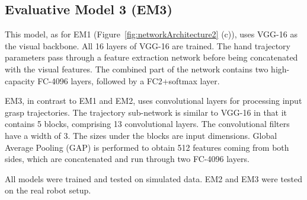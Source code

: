 \subsection{Evaluative Model 3 (EM3)}
\noindent
This model, as for EM1 (Figure~\ref{fig:networkArchitecture2} (c)), uses VGG-16 as the visual backbone. All 16 layers of VGG-16 are trained. The hand trajectory parameters pass through a feature extraction network before being concatenated with the visual features. The combined part of the network contains two high-capacity FC-4096 layers, followed by a FC2+softmax layer.

EM3, in contrast to EM1 and EM2, uses convolutional layers for processing input grasp trajectories. The trajectory sub-network is similar to VGG-16 in that it contains 5 blocks, comprising 13 convolutional layers. The convolutional filters have a width of 3. The sizes under the blocks are input dimensions. Global Average Pooling (GAP) is performed to obtain 512 features coming from both sides, which are concatenated and run through two FC-4096 layers.

All models were trained and tested on simulated data. EM2 and EM3 were tested on the real robot setup. 


